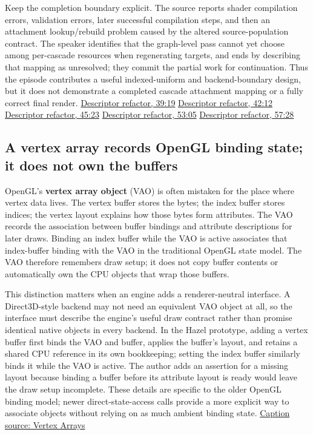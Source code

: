 Keep the completion boundary explicit. The source reports shader compilation errors, validation errors, later successful compilation steps, and then an attachment lookup/rebuild problem caused by the altered source-population contract. The speaker identifies that the graph-level pass cannot yet choose among per-cascade resources when regenerating targets, and ends by describing that mapping as unresolved; they commit the partial work for continuation. Thus the episode contributes a useful indexed-uniform and backend-boundary design, but it does not demonstrate a completed cascade attachment mapping or a fully correct final render. \href{https://www.youtube.com/watch?v=HahgZzF2Dfo&t=2358s}{Descriptor refactor, 39:19} \href{https://www.youtube.com/watch?v=HahgZzF2Dfo&t=2532s}{Descriptor refactor, 42:12} \href{https://www.youtube.com/watch?v=HahgZzF2Dfo&t=2722s}{Descriptor refactor, 45:23} \href{https://www.youtube.com/watch?v=HahgZzF2Dfo&t=3183s}{Descriptor refactor, 53:05} \href{https://www.youtube.com/watch?v=HahgZzF2Dfo&t=3447s}{Descriptor refactor, 57:28}

\subsection{A vertex array records OpenGL binding state; it does not own the buffers}\label{06-engine-ii-ch026-a-vertex-array-records-opengl-binding-state-it-does-not-own-the-buffers}

OpenGL's \textbf{vertex array object} (VAO) is often mistaken for the place where vertex data lives. The vertex buffer stores the bytes; the index buffer stores indices; the vertex layout explains how those bytes form attributes. The VAO records the association between buffer bindings and attribute descriptions for later draws. Binding an index buffer while the VAO is active associates that index-buffer binding with the VAO in the traditional OpenGL state model. The VAO therefore remembers draw setup; it does not copy buffer contents or automatically own the CPU objects that wrap those buffers.

This distinction matters when an engine adds a renderer-neutral interface. A Direct3D-style backend may not need an equivalent VAO object at all, so the interface must describe the engine's useful draw contract rather than promise identical native objects in every backend. In the Hazel prototype, adding a vertex buffer first binds the VAO and buffer, applies the buffer's layout, and retains a shared CPU reference in its own bookkeeping; setting the index buffer similarly binds it while the VAO is active. The author adds an assertion for a missing layout because binding a buffer before its attribute layout is ready would leave the draw setup incomplete. These details are specific to the older OpenGL binding model; newer direct-state-access calls provide a more explicit way to associate objects without relying on as much ambient binding state. \href{https://www.youtube.com/watch?v=rkxrw8dNrvI}{Caption source: Vertex Arrays}

